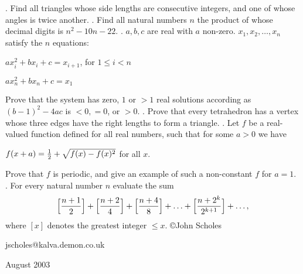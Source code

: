 \nopagenumbers
{}
\vskip 25pt
. Find all triangles whose side lengths are consecutive integers, and one of whose angles is twice another.
\vskip 12pt
. Find all natural numbers $n$ the product of whose decimal digits is $n^2-10n-22$.
\vskip 12pt
. $a,b,c$ are real with $a$ non-zero. $x_1,x_2,\ldots,x_n$ satisfy the $n$ equations:

$ax_i^2+bx_i+c=x_{i+1}$, for $1\le i<n$

$ax_n^2+bx_n+c=x_1$

\noindent Prove that the system has zero, $1$ or $>1$ real solutions according as $(b-1)^2-4ac$ is $<0,=0$, or $>0$.
\vskip 12pt
. Prove that every tetrahedron has a vertex whose three edges have the right lengths to form a triangle.
\vskip 12pt
. Let $f$ be a real-valued function defined for all real numbers, such that for some $a>0$ we have 

$f(x+a)={1\over2}+\sqrt{f(x)-f(x)^2}$ for all $x$.

\noindent Prove that $f$ is periodic, and give an example of such a non-constant $f$ for $a=1$.
\vskip 12pt
. For every natural number $n$ evaluate the sum $$\Bigl[{n+1\over2}\Bigr]+\Bigl[{n+2\over4}\Bigr]+\Bigl[{n+4\over8}\Bigr]+\ldots+\Bigl[{n+2^k\over2^{k+1}}\Bigr]+\ldots,$$ where $[x]$ denotes the greatest integer $\le x$.
\vskip 20pt
\noindent \copyright John Scholes

\noindent jscholes@kalva.demon.co.uk

 August 2003

\bye
